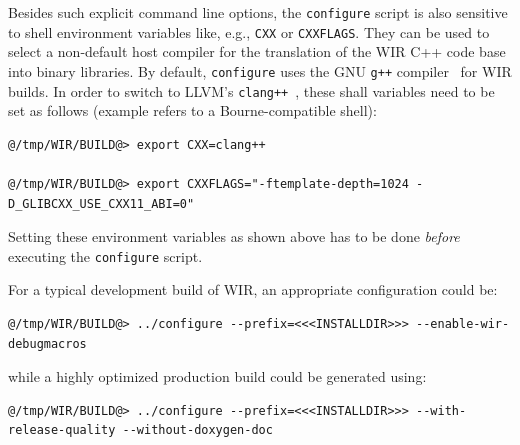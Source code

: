 Besides such explicit command line options, the \texttt{configure} script is also sensitive to shell environment variables like, e.g., \texttt{CXX} or \texttt{CXXFLAGS}.
They can be used to select a non-default host compiler for the translation of the \gls{WIR} C++ code base into binary libraries.
By default, \texttt{configure} uses the GNU \texttt{g++} compiler~\cite{gcc26} for \gls{WIR} builds.
In order to switch to LLVM's \texttt{clang++}~\cite{llvm26}, these shall variables need to be set as follows (example refers to a Bourne-compatible shell):

\begin{lstlisting}[style=commandline,float=h]
@/tmp/WIR/BUILD@> export CXX=clang++

@/tmp/WIR/BUILD@> export CXXFLAGS="-ftemplate-depth=1024 -D_GLIBCXX_USE_CXX11_ABI=0"
\end{lstlisting}

\begin{wirNote}
  Setting these environment variables as shown above has to be done \textit{before} executing the \texttt{configure} script.
\end{wirNote}

For a typical development build of \gls{WIR}, an appropriate configuration could be:

\begin{lstlisting}[style=commandline,float=h]
@/tmp/WIR/BUILD@> ../configure --prefix=<<<INSTALLDIR>>> --enable-wir-debugmacros
\end{lstlisting}

while a highly optimized production build could be generated using:

\begin{lstlisting}[style=commandline,float=h]
@/tmp/WIR/BUILD@> ../configure --prefix=<<<INSTALLDIR>>> --with-release-quality --without-doxygen-doc
\end{lstlisting}

\cleardoubleoddpage
